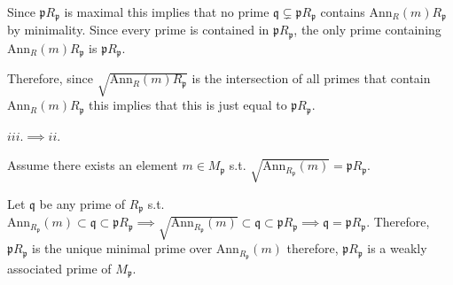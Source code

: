 \documentclass[12pt, letterpaper]{article}
\newcommand{\p}{\mathfrak{p}}
\newcommand{\Ann}{\mathrm{Ann}}
\newcommand{\mf}[1]{\mathfrak{#1}}
\begin{document}
\begin{problemproof}
    Since $\p R_\p$ is maximal this implies that no prime $\mf{q} \subsetneq \p R_\p$ contains $\Ann_R(m) R_\p$ by minimality. Since every prime is contained in $\p R_\p$, the only prime containing $\Ann_R(m)R_\p$ is $\p R_\p$.

    Therefore, since $\sqrt{\Ann_R(m) R_\p}$ is the intersection of all primes that contain $\Ann_R(m) R_\p$ this implies that this is just equal to $\p R_\p$.

    $iii. \implies ii.$

    Assume there exists an element $m \in M_\p$ s.t. $\sqrt{\Ann_{R_\p}(m)}=\p R_\p$.

    Let $\mf{q}$ be any prime of $R_\p$ s.t. $\Ann_{R_\p}(m) \subset \mf{q} \subset \p R_\p \implies \sqrt{\Ann_{R_\p}(m)} \subset \mf{q} \subset \p R_\p \implies \mf{q} = \p R_\p$. Therefore, $\p R_\p$ is the unique minimal prime over $\Ann_{R_{\p}}(m)$ therefore, $\p R_\p$ is a weakly associated prime of $M_\p$.
\end{problemproof}
\end{document}

